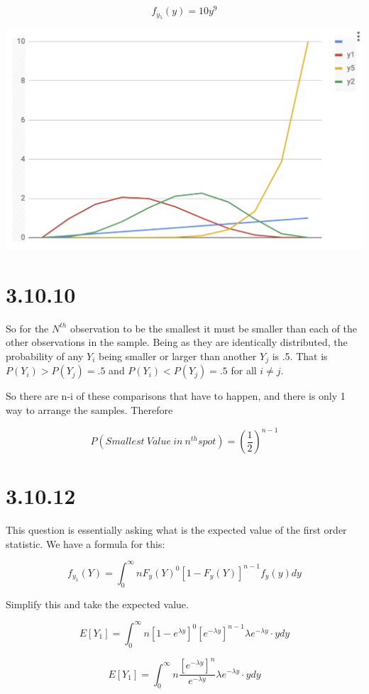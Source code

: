 \documentclass[svgnames]{article}
\begin{document}
$$f_{y_{5}}(y)=10y^{9}$$


\includegraphics[scale=.65]{graphs}

\section{3.10.10}

So for the $N^{th}$ observation to be the smallest it must be smaller than each of the other observations in the sample. Being as they are identically distributed, the probability of any $Y_{i}$ being smaller or larger than another $Y_{j}$ is .5. That is $P(Y_{i}) > P(Y_{j})=.5$ and  $P(Y_{i}) < P(Y_{j})=.5$ for all $i \neq j$.

So there are n-i of these comparisons that have to happen, and there is only 1 way to arrange the samples. Therefore

$$P(Smallest \ Value \ in \ n^{th} spot) = (\frac{1}{2})^{n-1}$$


\section{3.10.12}

This question is essentially asking what is the expected value of the first order statistic. We have a formula for this: 

$$f_{y_{1}}(Y) = \int_{0}^{\infty}n F_{y}(Y)^0[1- F_{y}(Y)]^{n-1} f_{y}(y) dy$$

Simplify this and take the expected value.

$$ E[Y_1]  = \int_{0}^{\infty} n [1-e^{\lambda y}]^0 [e^{-\lambda y}]^{n-1} \lambda e^{-\lambda y} \cdot y dy$$

$$ E[Y_1]  = \int_{0}^{\infty} n \frac{[e^{-\lambda y}]^{n}}{e^{-\lambda y}} \lambda e^{-\lambda y} \cdot y dy$$
\end{document}
